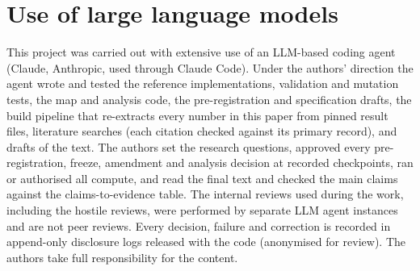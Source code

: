 \section*{Use of large language models}
This project was carried out with extensive use of an LLM-based coding agent (Claude, Anthropic, used through Claude Code).
Under the authors' direction the agent wrote and tested the reference implementations, validation and mutation tests, the
map and analysis code, the pre-registration and specification drafts, the build pipeline that re-extracts every number in
this paper from pinned result files, literature searches (each citation checked against its primary record), and drafts of
the text. The authors set the research questions, approved every pre-registration, freeze, amendment and analysis decision at
recorded checkpoints, ran or authorised all compute, and read the final text and checked the main claims against the
claims-to-evidence table. The internal reviews used during the work, including the hostile reviews, were performed by separate
LLM agent instances and are not peer reviews. Every decision, failure and correction is recorded in append-only disclosure
logs released with the code (anonymised for review). The authors take full responsibility for the content.
